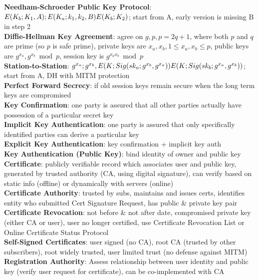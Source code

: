 \documentclass[a4paper]{article}
\begin{document}
\begin{multicols}{2}
        \textbf{Needham-Schroeder Public Key Protocol}: $E(K_b; K_1, A); E(K_a; k_1, k_2, B)\\E(K_b; K_2)$; start from A, early version is missing B in step 2\\
        \textbf{Diffie-Hellman Key Agreement}: agree on $g, p, p=2q+1$, where both $p$ and $q$ are prime (so $p$ is safe prime), private keys are $x_a, x_b, 1 \leq x_a, x_b \leq p$, public keys are $g^{x_a}, g^{x_b} \bmod p$, session key is $g^{x_a x_b} \bmod p$\\
        \textbf{Station-to-Station}: $g^{x_a}; g^{x_b}, E(K; Sig(sk_a; g^{x_b}, g^{x_a}))\\E(K; Sig(sk_b; g^{x_a}, g^{x_b}))$; start from A, DH with MITM protection\\
        \textbf{Perfect Forward Secrecy}: if old session keys remain secure when the long term keys are compromised\\
        \textbf{Key Confirmation}: one party is assured that all other parties actually have possession of a particular secret key\\
        \textbf{Implicit Key Authentication}: one party is assured that only specifically identified parties can derive a particular key\\
        \textbf{Explicit Key Authentication}: key confirmation + implicit key auth\\
        \textbf{Key Authentication (Public Key)}: bind identity of owner and public key\\
        \textbf{Certificate}: publicly verifiable record which associates user and public key, generated by trusted authority (CA, using digital signature), can verify based on static info (offline) or dynamically with servers (online)\\
        \textbf{Certificate Authority}: trusted by subs, maintains and issues certs, identifies entity who submitted Cert Signature Request, has public \& private key pair\\
        \textbf{Certificate Revocation}: not before \& not after date, compromised private key (either CA or user), user no longer certified, use Certificate Revocation List or Online Certificate Status Protocol\\
        \textbf{Self-Signed Certificates}: user signed (no CA), root CA (trusted by other subscribers), root widely trusted, user limited trust (no defense against MITM)\\
        \textbf{Registration Authority}: Assess relationship between user identity and public key (verify user request for certificate), can be co-implemented with CA\\

\end{multicols}
\end{document}
